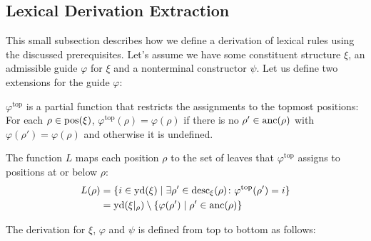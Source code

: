 \documentclass[../../document.tex]{subfiles}
\begin{document}
    \subsection{Lexical Derivation Extraction}\label{sec:extractionalg}
    This small subsection describes how we define a derivation of lexical  rules using the discussed prerequisites.
    Let's assume we have some constituent structure \(\xi\), an admissible guide \(\varphi\) for \(\xi\) and a nonterminal constructor \(\psi\).
    Let us define two extensions for the guide \(\varphi\):
    \begin{compactitem}
        \item
            \(\varphi^{\text{top}}\) is a partial function that restricts the assignments to the topmost positions:
            For each \(\rho \in \operatorname{pos}(\xi)\), \(\varphi^{\text{top}}(\rho) = \varphi(\rho)\) if there is no \(\rho' \in \operatorname{anc}(\rho)\) with \(\varphi(\rho') = \varphi(\rho)\) and otherwise it is undefined.
        \item
            The function \(L\) maps each position \(\rho\) to the set of leaves that \(\varphi^{\text{top}}\) assigns to positions at or below \(\rho\):
                \vspace{-\baselineskip}
                \begin{align*}
                    L(\rho) &= \{ i \in \operatorname{yd}(\xi) \mid \exists \rho' \in \operatorname{desc}_\xi(\rho)\colon \varphi^{\text{top}}(\rho') = i \} \\
                            &= \operatorname{yd}(\xi|_\rho) \setminus \{ \varphi(\rho') \mid \rho' \in \operatorname{anc}(\rho) \}
                \end{align*}
    \end{compactitem}
    The derivation for \(\xi\), \(\varphi\) and \(\psi\) is defined from top to bottom as follows:
\end{document}
